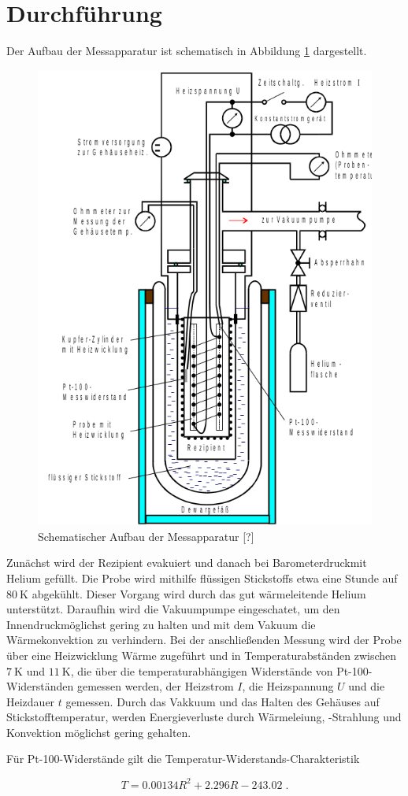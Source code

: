 \section{Durchführung}
\label{sec:Durchführung}

Der Aufbau der Messapparatur ist schematisch in Abbildung \ref{fig:bild1} dargestellt.


\begin{figure}
    \centering
    \includegraphics[scale = 0.7]{content/plot2.png}
    \caption{Schematischer Aufbau der Messapparatur [?]}
    \label{fig:bild1}
  \end{figure}


Zunächst wird der Rezipient evakuiert und danach bei Barometerdruckmit Helium gefüllt.
Die Probe wird mithilfe flüssigen Stickstoffs etwa eine Stunde auf $\SI{80}{\kelvin}$ abgekühlt.
Dieser Vorgang wird durch das gut wärmeleitende Helium unterstützt.
Daraufhin wird die Vakuumpumpe eingeschatet, um den Innendruckmöglichst gering zu halten und
mit dem Vakuum die Wärmekonvektion zu verhindern.
Bei der anschließenden Messung wird der Probe über eine Heizwicklung Wärme zugeführt und in 
Temperaturabständen zwischen $\SI{7}{\kelvin}$ und $\SI{11}{\kelvin}$, die über die temperaturabhängigen
 Widerstände von Pt-100-Widerständen gemessen werden, der Heizstrom $I$, die Heizspannung $U$ und die
 Heizdauer $t$ gemessen.
 Durch das Vakkuum und das Halten des Gehäuses auf Stickstofftemperatur, werden Energieverluste durch
 Wärmeleiung, -Strahlung und Konvektion möglichst gering gehalten.

Für Pt-100-Widerstände gilt die Temperatur-Widerstands-Charakteristik

\begin{equation}
    \label{eqn:Temp}
    T = 0.00134 R^2 + 2.296 R - 243.02 \; .
\end{equation}

